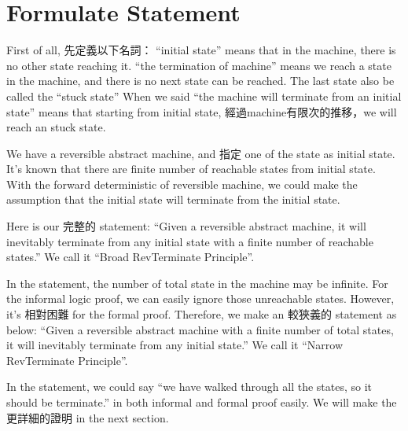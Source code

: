\section{Formulate Statement}

First of all, 先定義以下名詞：
``initial state'' means that in the machine, there is no other state reaching it.
``the termination of machine'' means we reach a state in the machine, and there is no next state can be reached.  The last state also be called the ``stuck state''
When we said ``the machine will terminate from an initial state'' means that starting from initial state, 經過machine有限次的推移，we will reach an stuck state.

We have a reversible abstract machine, and 指定 one of the state as initial state.  
It's known that there are finite number of reachable states from initial state.  
With the forward deterministic of reversible machine, we could make the assumption that the initial state will terminate from the initial state.

Here is our 完整的 statement:
``Given a reversible abstract machine, it will inevitably terminate from any initial state with a finite number of reachable states.''
We call it ``Broad RevTerminate Principle''.

In the statement, the number of total state in the machine may be infinite.
For the informal logic proof, we can easily ignore those unreachable states.  However, it's 相對困難 for the formal proof.
Therefore, we make an 較狹義的 statement as below:
``Given a reversible abstract machine with a finite number of total states, it will inevitably terminate from any initial state.''
We call it ``Narrow RevTerminate Principle''.

In the statement, we could say ``we have walked through all the states, so it should be terminate.'' in both informal and formal proof easily.
We will make the 更詳細的證明 in the next section.